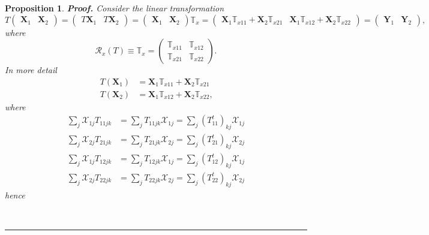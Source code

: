 \documentclass[aps, preprint]{revtex4}
\newtheorem{proposition}[theorem]{Proposition}
\newenvironment{proof}[1][Proof]{\noindent\textbf{#1.} }{\ \rule{0.5em}{0.5em}}
\begin{document}
\begin{proposition}
\begin{proof}
Consider the linear transformation
\begin{equation}T \left (\begin{array}{cc}\mathbf{X}_{1} & \mathbf{X}_{2}\end{array}\right ) =\left (\begin{array}{cc}T \mathbf{X}_{1} & T \mathbf{X}_{2}\end{array}\right ) =\left (\begin{array}{cc}\mathbf{X}_{1} & \mathbf{X}_{2}\end{array}\right ) \mathbb{T}_{x} =\left (\begin{array}{cc}\mathbf{X}_{1} \mathbb{T}_{x 1 1} +\mathbf{X}_{2} \mathbb{T}_{x 2 1} & \mathbf{X}_{1} \mathbb{T}_{x 1 2} +\mathbf{X}_{2} \mathbb{T}_{x 2 2}\end{array}\right ) =\left (\begin{array}{cc}\mathbf{Y}_{1} & \mathbf{Y}_{2}\end{array}\right )\text{,}
\end{equation}where
\begin{equation}\mathcal{R}_{x} \left (T\right ) \equiv \mathbb{T}_{x} =\left (\begin{array}{cc}\mathbb{T}_{x 1 1} & \mathbb{T}_{x 1 2} \\
\mathbb{T}_{x 2 1} & \mathbb{T}_{x 2 2}\end{array}\right )\text{.}
\end{equation}In more detail
\begin{align}T \left (\mathbf{X}_{1}\right ) &  =\mathbf{X}_{1} \mathbb{T}_{x 1 1} +\mathbf{X}_{2} \mathbb{T}_{x 2 1} \\
T \left (\mathbf{X}_{2}\right ) &  =\mathbf{X}_{1} \mathbb{T}_{x 1 2} +\mathbf{X}_{2} \mathbb{T}_{x 2 2}\text{,}\end{align}where
\begin{align}\sum _{j}\mathcal{X}_{1 j} T_{1 1 j k} &  =\sum _{j}T_{1 1 j k} \mathcal{X}_{1 j} =\sum _{j}\left (T_{1 1}^{t}\right )_{k j} \mathcal{X}_{1 j} \\
\sum _{j}\mathcal{X}_{2 j} T_{2 1 j k} &  =\sum _{j}T_{2 1 j k} \mathcal{X}_{2 j} =\sum _{j}\left (T_{2 1}^{t}\right )_{k j} \mathcal{X}_{2 j}\end{align}
\begin{align}\sum _{j}\mathcal{X}_{1 j} T_{1 2 j k} &  =\sum _{j}T_{1 2 j k} \mathcal{X}_{1 j} =\sum _{j}\left (T_{1 2}^{t}\right )_{k j} \mathcal{X}_{1 j} \\
\sum _{j}\mathcal{X}_{2 j} T_{2 2 j k} &  =\sum _{j}T_{2 2 j k} \mathcal{X}_{2 j} =\sum _{j}\left (T_{2 2}^{t}\right )_{k j} \mathcal{X}_{2 j}\end{align}hence

\end{proof}
\end{proposition}
\end{document}
